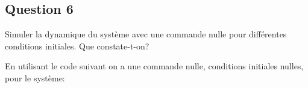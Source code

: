 \documentclass[class=article, crop=false]{standalone}
\begin{document}
\newpage
\subsection{Question 6}
\begin{exercise}
    Simuler la dynamique du système avec une commande nulle pour différentes conditions initiales. Que constate-t-on?
\end{exercise}
\begin{resolution}
    En utilisant le code suivant on a une commande nulle, conditions initiales nulles, pour le système:
    \begin{scriptsize}\mycode
        
        
    \end{scriptsize}


\end{resolution}
\end{document}
